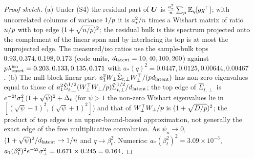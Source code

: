 \begin{proof}[Proof sketch]
(a) Under (S4) the residual part of $\bm{U}$ is $\frac{a_*^2}{n}\sum_\mu\mathbb{E}_\eta[gg^\top]$; with uncorrelated columns of variance $1/p$ it is $a_*^2/n$ times a Wishart matrix of ratio $n/p$ with top edge $(1+\sqrt{n/p})^2$; the residual bulk is this spectrum projected onto the complement of the linear span and by interlacing its top is at most the unprojected edge. The measured/iso ratios use the sample-bulk tops $0.93,0.374,0.198,0.173$ (code units, $d_{\mathrm{latent}}=10,40,100,200$) against $p\lambda^{\rm iso}_{\rm onset}=0.203,0.133,0.135,0.171$ with $a_*(q)^2=0.0447,0.0125,0.00644,0.00467$. (b) The null-block linear part $a_1^2W_\perp\hat\Sigma_{t,\perp}W_\perp^\top/(pd_{\mathrm{latent}})$ has non-zero eigenvalues equal to those of $a_1^2\hat\Sigma_{t,\perp}^{1/2}(W_\perp^\top W_\perp/p)\hat\Sigma_{t,\perp}^{1/2}/d_{\mathrm{latent}}$; the top edge of $\hat\Sigma_{t,\perp}$ is $e^{-2t}\sigma_{\perp}^2(1+\sqrt\psi)^2+\Delta_t$ (for $\psi>1$ the non-zero Wishart eigenvalues lie in $[(\sqrt\psi-1)^2,(\sqrt\psi+1)^2]$) and that of $W_\perp^\top W_\perp/p$ is $(1+\sqrt{D/p})^2$; the product of top edges is an upper-bound-based approximation, not generally the exact edge of the free multiplicative convolution. As $\psi_n\to0$, $(1+\sqrt\psi)^2/d_{\mathrm{latent}}\to1/n$ and $q\to\beta_t^2$. Numerics: $a_*(\beta_t^2)^2=3.09\times10^{-3}$, $a_1(\beta_t^2)^2e^{-2t}\sigma_{\perp}^2=0.671\times0.245=0.164$.
\end{proof}

